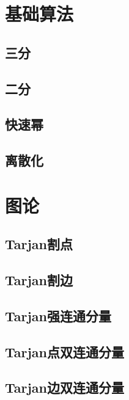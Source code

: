 \documentclass{article}
\begin{document}
\begin{multicols*}{2}

\thispagestyle{empty}
\tableofcontents
\newpage
\setcounter{page}{1}
\section{基础算法}
\subsection{三分}

\subsection{二分}

\subsection{快速幂}

\subsection{离散化}

\section{图论}
\subsection{Tarjan割点}

\subsection{Tarjan割边}

\subsection{Tarjan强连通分量}

\subsection{Tarjan点双连通分量}

\subsection{Tarjan边双连通分量}


\end{multicols*}
\end{document}
